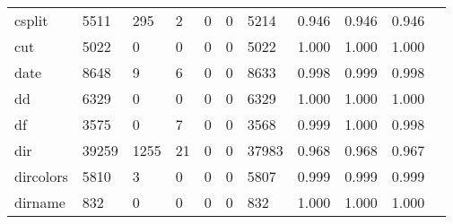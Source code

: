 \begin{longtable}{lp{1.10cm}p{1.10cm}p{1.10cm}p{1.10cm}p{1.10cm}p{1.10cm}p{1.10cm}p{1.10cm}p{1.10cm}p{1.10cm}}
csplit    &                   5511 &                                295 &                                 2 &                                0 &                                 0 &                            5214 &                             0.946 &                                 0.946 &                               0.946 \\
cut       &                   5022 &                                  0 &                                 0 &                                0 &                                 0 &                            5022 &                             1.000 &                                 1.000 &                               1.000 \\
date      &                   8648 &                                  9 &                                 6 &                                0 &                                 0 &                            8633 &                             0.998 &                                 0.999 &                               0.998 \\
dd        &                   6329 &                                  0 &                                 0 &                                0 &                                 0 &                            6329 &                             1.000 &                                 1.000 &                               1.000 \\
df        &                   3575 &                                  0 &                                 7 &                                0 &                                 0 &                            3568 &                             0.999 &                                 1.000 &                               0.998 \\
dir       &                  39259 &                               1255 &                                21 &                                0 &                                 0 &                           37983 &                             0.968 &                                 0.968 &                               0.967 \\
dircolors &                   5810 &                                  3 &                                 0 &                                0 &                                 0 &                            5807 &                             0.999 &                                 0.999 &                               0.999 \\
dirname   &                    832 &                                  0 &                                 0 &                                0 &                                 0 &                             832 &                             1.000 &                                 1.000 &                               1.000 \\

\end{longtable}
